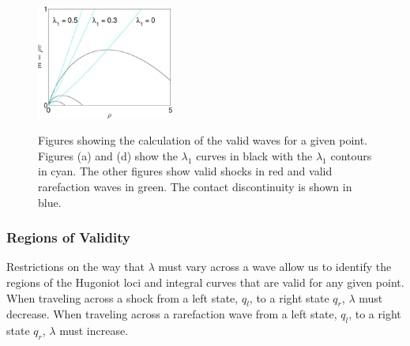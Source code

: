 \documentclass{article}
\begin{document}
\begin{figure}[h!]
{  \includegraphics[width=45mm]{../MatlabCode/Images/Validity_M.jpg}
   }
 \caption[Optional caption for list of figures]
 {Figures showing the calculation of the valid waves for a given point. Figures (a)
  and (d) show the $\lambda_1$ curves in black with the $\lambda_1$ contours 
  in cyan. The other figures show valid shocks in red and valid rarefaction 
  waves in green. The contact discontinuity is shown in blue.}
   \label{fig:AR_validity}
\end{figure}

\subsubsection{Regions of Validity}
Restrictions on the way that $\lambda$ must vary across a wave allow us to identify the regions of the Hugoniot loci and integral curves that are valid for any given point. When traveling across a shock from a left state, $q_l$, to a right state $q_r$, $\lambda$ must decrease. When traveling across a rarefaction wave from a left state, $q_l$, to a right state $q_r$, $\lambda$ must increase. 
\end{document}
